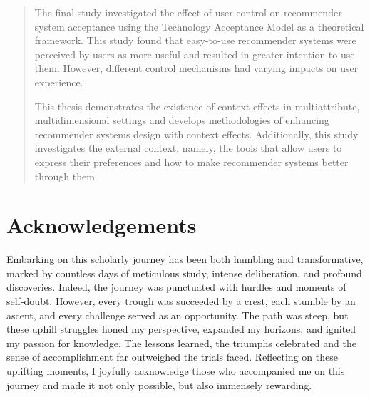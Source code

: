 \documentclass[a4paper,12pt]{article}
\begin{document}
\begin{abstract}
The final study investigated the effect of user control on recommender system acceptance using the Technology Acceptance Model as a theoretical framework. This study found that easy-to-use recommender systems were perceived by users as more useful and resulted in greater intention to use them. However, different control mechanisms had varying impacts on user experience.

This thesis demonstrates the existence of context effects in multiattribute, multidimensional settings and develops methodologies of enhancing recommender systems design with context effects. Additionally, this study investigates the external context, namely, the tools that allow users to express their preferences and how to make recommender systems better through them.
           
   
\end{abstract}
\clearpage

\section*{Acknowledgements}

Embarking on this scholarly journey has been both humbling and transformative, marked by countless days of meticulous study, intense deliberation, and profound discoveries. Indeed, the journey was punctuated with hurdles and moments of self-doubt. However, every trough was succeeded by a crest, each stumble by an ascent, and every challenge served as an opportunity. The path was steep, but these uphill struggles honed my perspective, expanded my horizons, and ignited my passion for knowledge. The lessons learned, the triumphs celebrated and the sense of accomplishment far outweighed the trials faced. Reflecting on these uplifting moments, I joyfully acknowledge those who accompanied me on this journey and made it not only possible, but also immensely rewarding.
\end{document}
